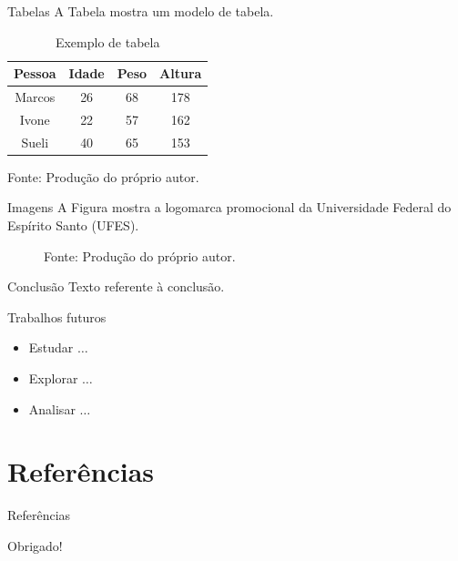 \documentclass[11pt]{beamer}
\begin{document}
\begin{frame}{Tabelas}
    A Tabela mostra um modelo de tabela.

    \begin{table}[htb]
        \caption{Exemplo de tabela}
        \label{tab:modelo_tabela}
        \centering
        \begin{tabular}{c|c|c|c}
	        \hline
	        \textbf{Pessoa} & \textbf{Idade} & \textbf{Peso} & \textbf{Altura} \\ \hline
	        Marcos & 26    & 68   & 178    \\ \hline
	        Ivone  & 22    & 57   & 162    \\ \hline
	        Sueli  & 40    & 65   & 153    \\ \hline
        \end{tabular}
        
        \medskip
        
        Fonte: Produção do próprio autor.
    \end{table}
\end{frame}

\begin{frame}{Imagens}
    A Figura mostra a logomarca promocional da Universidade Federal do Espírito Santo (UFES).
    
    \begin{figure}[htb]
      
        
        \medskip
        
        Fonte: Produção do próprio autor.
    \end{figure}
\end{frame}

\begin{frame}{Conclusão}
    Texto referente à conclusão.
\end{frame}

\begin{frame}{Trabalhos futuros}
    \begin{itemize}
        \item Estudar $\ldots$
        
        \medskip
        
        \item Explorar $\ldots$
        
        \medskip
        
        \item Analisar $\ldots$
    \end{itemize}
\end{frame}

\section{Referências}
\begin{frame}{Referências}
    
\end{frame}

\begin{frame}

\begin{center}
    Obrigado!
    
    \email
\end{center}

\begin{figure}[htb]
    \centering

\end{figure}

\end{frame}
\end{document}
